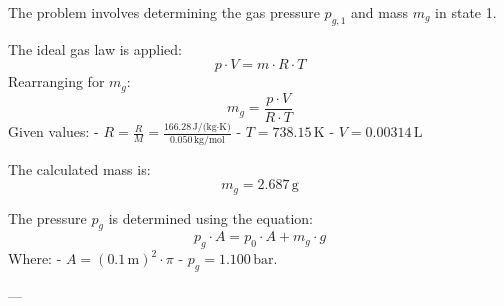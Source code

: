 The problem involves determining the gas pressure \( p_{g,1} \) and mass \( m_g \) in state 1.  

The ideal gas law is applied:  
\[
p \cdot V = m \cdot R \cdot T
\]  
Rearranging for \( m_g \):  
\[
m_g = \frac{p \cdot V}{R \cdot T}
\]  
Given values:  
- \( R = \frac{R}{M} = \frac{166.28 \, \text{J/(kg·K)}}{0.050 \, \text{kg/mol}} \)  
- \( T = 738.15 \, \text{K} \)  
- \( V = 0.00314 \, \text{L} \)  

The calculated mass is:  
\[
m_g = 2.687 \, \text{g}
\]  

The pressure \( p_g \) is determined using the equation:  
\[
p_g \cdot A = p_0 \cdot A + m_g \cdot g
\]  
Where:  
- \( A = (0.1 \, \text{m})^2 \cdot \pi \)  
- \( p_g = 1.100 \, \text{bar} \).  

---